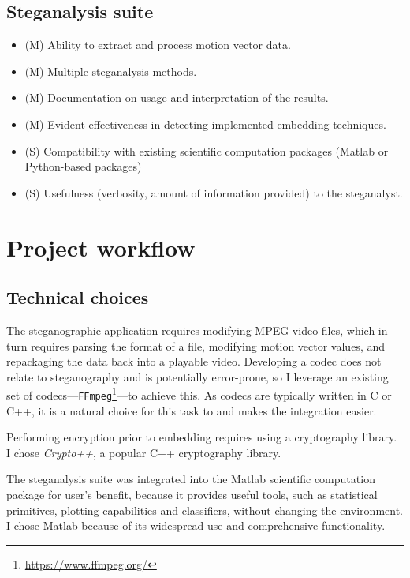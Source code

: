 \documentclass[12pt,british,twoside,notitlepage,usenames,dvipsnames,hypens,final]{report}
\numberwithin{equation}{section}
\numberwithin{figure}{section}
\begin{document}
\subsection{Steganalysis suite}
\label{req-steg-suite}
\begin{itemize}
\item (M) Ability to extract and process motion vector data.
\item (M) Multiple steganalysis methods.
\item (M) Documentation on usage and interpretation of the results.
\item (M) Evident effectiveness in detecting implemented embedding techniques.
\item (S) Compatibility with existing scientific computation packages (Matlab or Python-based packages)
\item (S) Usefulness (verbosity, amount of information provided) to the steganalyst.
\end{itemize}

\section{Project workflow}

\subsection{Technical choices}
\label{tech-choices}

The steganographic application requires modifying MPEG video files, which in turn requires parsing the format of a file, modifying motion vector values, and repackaging the data back into a playable video. Developing a codec does not relate to steganography and is potentially error-prone, so I leverage an existing set of codecs---\texttt{FFmpeg}\footnote{\url{https://www.ffmpeg.org/}}---to achieve this. As codecs are typically written in C or C++, it is a natural choice for this task to and makes the integration easier.

Performing encryption prior to embedding requires using a cryptography library. I chose \emph{Crypto++}, a popular C++ cryptography library.

The steganalysis suite was integrated into the Matlab scientific computation package for user's benefit, because it provides useful tools, such as statistical primitives, plotting capabilities and classifiers, without changing the environment. I chose Matlab  because of its widespread use and comprehensive functionality.
\end{document}

